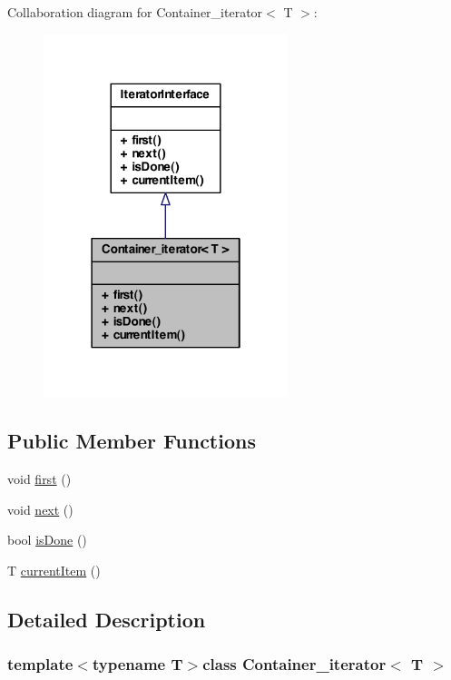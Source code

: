 Collaboration diagram for Container\_\-iterator$<$ T $>$:\nopagebreak
\begin{figure}[H]
\begin{center}
\leavevmode
\includegraphics[width=202pt]{class_container__iterator__coll__graph}
\end{center}
\end{figure}
\subsection*{Public Member Functions}
\begin{DoxyCompactItemize}
\item 
void \hyperlink{class_container__iterator_ae65040669ef8310ca448329119a31b2b}{first} ()
\item 
void \hyperlink{class_container__iterator_af86f52d0a5d37d3e8d82a2066be6a77b}{next} ()
\item 
bool \hyperlink{class_container__iterator_a2ede0faf715abf09377f59155ce16c8e}{isDone} ()
\item 
T \hyperlink{class_container__iterator_a4b38f2f628d39573ea004c1ebad5a9ba}{currentItem} ()
\end{DoxyCompactItemize}


\subsection{Detailed Description}
\subsubsection*{template$<$typename T$>$class Container\_\-iterator$<$ T $>$}

